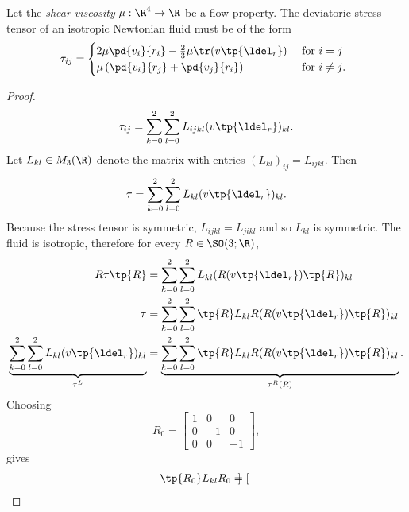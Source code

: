 \begin{thm}
    Let the \emph{shear viscosity} $\mu:\R^4\to \R$ be a flow property.
    The deviatoric stress tensor of an isotropic Newtonian fluid must be of the form
    \begin{equation}
        \tau_{ij} = \begin{cases}
            2 \mu \pd{v_i}{r_i} - \frac{2}{3} \mu \tr( v \tp{\ldel_r} ) &\text{ for $i=j$ } \\
            \mu \left( \pd{v_i}{r_j} + \pd{v_j}{r_i} \right) &\text{ for $i\neq j$. }
        \end{cases}
    \end{equation}
\end{thm}
\begin{proof}
    \begin{equation}
        \tau_{ij} = \sum_{k=0}^2 \sum_{l=0}^2 L_{ijkl} (v\tp{\ldel_r})_{kl}.
    \end{equation}
    Let $L_{kl}\in M_3(\R)$ denote the matrix with entries $(L_{kl})_{ij} = L_{ijkl}$.  Then
    \begin{equation}
        \tau = \sum_{k=0}^2 \sum_{l=0}^2 L_{kl} (v\tp{\ldel_r})_{kl}.
    \end{equation}
    Because the stress tensor is symmetric, $L_{ijkl}=L_{jikl}$ and so $L_{kl}$ is symmetric.
    The fluid is isotropic, therefore for every $R\in \SO(3;\R)$,
    \begin{align}
        R \tau \tp{R} &= \sum_{k=0}^2 \sum_{l=0}^2 L_{kl} (R (v \tp{\ldel_r}) \tp{R})_{kl} \\
        \tau &= \sum_{k=0}^2 \sum_{l=0}^2 \tp{R} L_{kl} R (R (v \tp{\ldel_r}) \tp{R})_{kl} \\
        \underbrace{ \sum_{k=0}^2 \sum_{l=0}^2 L_{kl} (v \tp{\ldel_r})_{kl}}_{\tau^L} &=
            \underbrace{\sum_{k=0}^2 \sum_{l=0}^2 \tp{R} L_{kl} R (R (v \tp{\ldel_r}) \tp{R})_{kl}}_{\tau^R(R)}.
    \end{align}
    Choosing
    \begin{equation}
        R_0 = \begin{bmatrix}
            1 & 0 & 0 \\
            0 & -1 & 0 \\
            0 & 0 & -1
        \end{bmatrix},
    \end{equation}
    gives
    \begin{align}
        \tp{R_0} L_{kl} R_0 &= \begin{bmatrix}

\end{bmatrix}
\end{align}
\end{proof}
